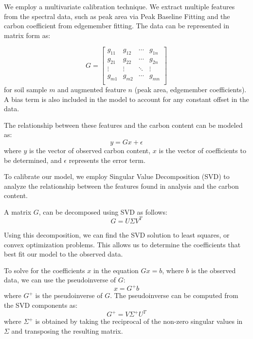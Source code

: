 \documentclass[preprint, 12pt]{elsarticle}
\begin{document}
We employ a multivariate calibration technique. We extract multiple features from the spectral data, such as peak area via Peak Baseline Fitting and the carbon coefficient from edgemember fitting. The data can be represented in matrix form as:

\[
G = 
\begin{bmatrix}
    g_{11} & g_{12} & \cdots & g_{1n} \\
    g_{21} & g_{22} & \cdots & g_{2n} \\
    \vdots & \vdots & \ddots & \vdots \\
    g_{m1} & g_{m2} & \cdots & g_{mn} \\
\end{bmatrix}
\]
for soil sample $m$ and augmented feature $n$ (peak area, edgemember coefficients). A bias term is also included in the model to account for any constant offset in the data.

The relationship between these features and the carbon content can be modeled as:
\[
y = Gx + \epsilon
\]
where $y$ is the vector of observed carbon content, $x$ is the vector of coefficients to be determined, and $\epsilon$ represents the error term.

To calibrate our model, we employ Singular Value Decomposition (SVD) to 
analyze the relationship between the features found in analysis and the carbon content.

A matrix $G$, can be decomposed using SVD as follows:
\begin{equation}
    G = U \Sigma V^T
\end{equation}

Using this decomposition, we can find the SVD solution to least squares, or convex optimization problems.
This allows us to determine the coefficients that best fit our model to the observed data.

To solve for the coefficients $x$ in the equation $Gx = b$, where $b$ is the observed data, we can use the pseudoinverse of $G$:
\begin{equation}
    x = G^+ b
\end{equation}
where $G^+$ is the pseudoinverse of $G$.
The pseudoinverse can be computed from the SVD components as:
\begin{equation}
    G^+ = V \Sigma^+ U^T
\end{equation}
where $\Sigma^+$ is obtained by taking the reciprocal of the non-zero singular values in $\Sigma$ and transposing the resulting matrix.
\end{document}
